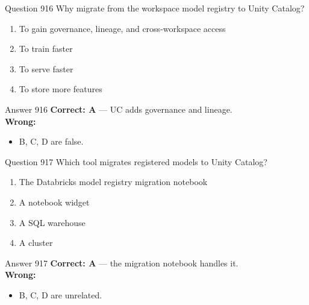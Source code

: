 \documentclass[aspectratio=169,11pt]{beamer}
\begin{document}
	\begin{frame}{Question 916}
		Why migrate from the workspace model registry to Unity Catalog?
		\begin{enumerate}[label=\Alph*.]
			\item To gain governance, lineage, and cross-workspace access
			\item To train faster
			\item To serve faster
			\item To store more features
		\end{enumerate}
	\end{frame}
	\begin{frame}{Answer 916}
		\textbf{Correct: A} --- UC adds governance and lineage.\\
		\vspace{0.5em}
		\textbf{Wrong:}
		\begin{itemize}
			\item B, C, D are false.
		\end{itemize}
	\end{frame}
	
	\begin{frame}{Question 917}
		Which tool migrates registered models to Unity Catalog?
		\begin{enumerate}[label=\Alph*.]
			\item The Databricks model registry migration notebook
			\item A notebook widget
			\item A SQL warehouse
			\item A cluster
		\end{enumerate}
	\end{frame}
	\begin{frame}{Answer 917}
		\textbf{Correct: A} --- the migration notebook handles it.\\
		\vspace{0.5em}
		\textbf{Wrong:}
		\begin{itemize}
			\item B, C, D are unrelated.
		\end{itemize}
	\end{frame}
	
\end{document}
